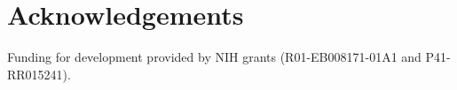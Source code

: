 \documentclass{InsightArticle}
\begin{document}
\section{Acknowledgements}

Funding for development provided by NIH grants (R01-EB008171-01A1 
and P41-RR015241).

%
%



\end{document}
